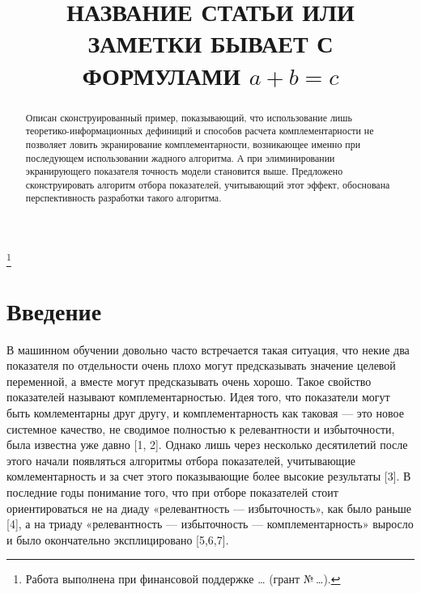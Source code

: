 \documentclass[12pt]{a&t}
\begin{document}

\title{НАЗВАНИЕ СТАТЬИ ИЛИ ЗАМЕТКИ БЫВАЕТ С ФОРМУЛАМИ $a+b=c$}%
\thanks{Работа выполнена при финансовой поддержке \dots
(грант \mbox{№\,\dots}).}


\maketitle

\begin{abstract}
Описан сконструированный пример, показывающий, что использование лишь теоретико-информационных дефиниций и способов расчета комплементарности не позволяет ловить экранирование комплементарности, возникающее именно при последующем использовании жадного алгоритма. А при элиминировании экранирующего показателя точность модели становится выше. Предложено сконструировать алгоритм отбора показателей, учитывающий этот эффект, обоснована перспективность разработки такого алгоритма.
\end{abstract}


\section{Введение}

В машинном обучении довольно часто встречается такая ситуация, что некие два показателя по отдельности очень плохо могут предсказывать значение целевой переменной, а вместе могут предсказывать очень хорошо. Такое свойство показателей называют комплементарностью. Идея того, что показатели могут быть комлементарны друг другу, и комплементарность как таковая — это новое системное качество, не сводимое полностью к релевантности и избыточности, была известна уже давно [1, 2]. Однако лишь через несколько десятилетий после этого начали появляться алгоритмы отбора показателей, учитывающие комлементарность и за счет этого показывающие более высокие результаты [3]. В последние годы понимание того, что при отборе показателей стоит ориентироваться не на диаду «релевантность — избыточность», как было раньше [4], а на триаду «релевантность — избыточность — комплементарность» выросло и было окончательно эксплицировано [5,6,7].
\end{document}
